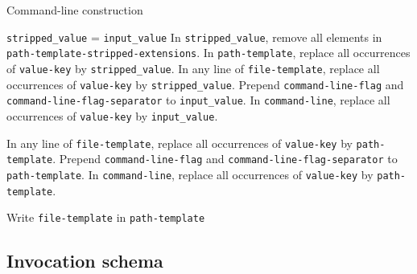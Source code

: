 \documentclass[a4paper,num-refs]{oup-contemporary}
\begin{document}
\begin{algorithm}[h!]
\caption{Command-line construction}
\label{algo:command-line}
\begin{algorithmic}
  \State {}
  \State \texttt{stripped\_value} = \texttt{input\_value}
  \State In \texttt{stripped\_value}, remove  all elements in \texttt{path-template-stripped-extensions}.
  \EndIf
  \State In \texttt{path-template}, replace all occurrences of \texttt{value-key} by \texttt{stripped\_value}.
  \State In any line of \texttt{file-template}, replace all occurrences of \texttt{value-key} by \texttt{stripped\_value}.
  \EndIf
  \EndFor
  \State Prepend \texttt{command-line-flag} and \texttt{command-line-flag-separator} to \texttt{input\_value}.
  \State In \texttt{command-line}, replace all occurrences of \texttt{value-key} by \texttt{input\_value}.
  \EndIf
  \EndFor

  \State {}
  \State In any line of \texttt{file-template}, replace all occurrences of \texttt{value-key} by \texttt{path-template}.
  \State {}
  \EndIf
  \EndFor
  \State Prepend \texttt{command-line-flag} and \texttt{command-line-flag-separator} to \texttt{path-template}.
  \State In \texttt{command-line}, replace all occurrences of \texttt{value-key} by \texttt{path-template}.
  \EndIf
  \EndFor

  \State {}
  \State Write \texttt{file-template} in \texttt{path-template}
  \State {}
  \EndIf
  \EndFor

\end{algorithmic}
\end{algorithm}

\subsection{Invocation schema}
\end{document}
